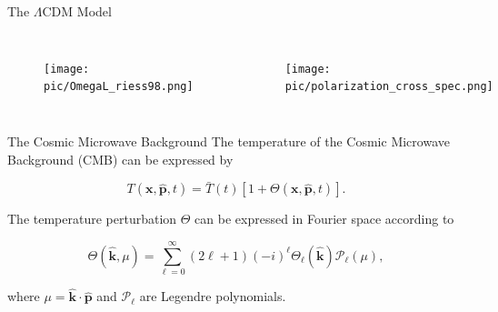 \documentclass[serif, aspectratio=169]{beamer}
\begin{document}
\begin{frame}{The $\Lambda$CDM Model}
	\begin{columns}
	
	\begin{figure}
	\centering
	\texttt{[image: pic/OmegaL\_riess98.png]}
	\end{figure}
	
	\begin{figure}
	\centering
	\texttt{[image: pic/polarization\_cross\_spec.png]}
	\end{figure}
	
	\end{columns}
\end{frame}

\begin{frame}{The Cosmic Microwave Background}
    The temperature of the Cosmic Microwave Background (CMB) can be expressed by

    \begin{equation}\label{eq:temp_def}
        T(\mathbf{x}, \hat{\mathbf{p}}, t)=\bar{T}(t)[1+\Theta(\mathbf{x}, \hat{\mathbf{p}}, t)].
    \end{equation}

    The temperature perturbation $\Theta$ can be expressed in Fourier space according to

    \begin{equation}\label{eq:Theta_expand}
        \Theta(\hat{\mathbf{k}}, \mu)=\sum_{\ell=0}^\infty (2\ell+1)(-i)^\ell \Theta_\ell(\hat{\mathbf{k}})\mathcal{P}_\ell(\mu),
    \end{equation}

    where $\mu=\hat{\mathbf{k}}\cdot \hat{\mathbf{p}}$ and $\mathcal{P}_\ell$ are Legendre polynomials.

\end{frame}
\end{document}
